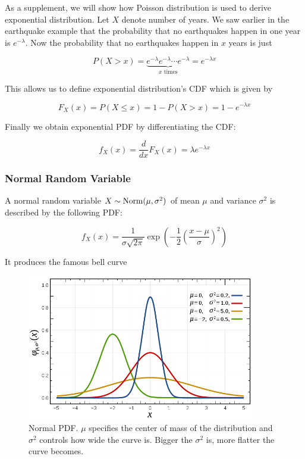 As a supplement, we will show how Poisson distribution is used to derive exponential distribution. Let $X$ denote number of years. We saw earlier in the earthquake example that the probability that no earthquakes happen in one year is $e^{-\lambda}$. Now the probability that no earthquakes happen in $x$ years is just

$$P(X>x)=\underbrace{e^{-\lambda}e^{-\lambda}\cdots e^{-\lambda}}_{\text{$x$ times}}=e^{-\lambda x}$$

This allows us to define exponential distribution's CDF which is given by

$$F_X(x)=P(X\le x)=1-P(X>x)=1-e^{-\lambda x}$$

Finally we obtain exponential PDF by differentiating the CDF:

$$f_X(x)=\frac{d}{dx}F_X(x)=\lambda e^{-\lambda x}$$

\subsubsection{Normal Random Variable}

A normal random variable $X\sim \operatorname{Norm}(\mu,\sigma^2)$ of mean $\mu$ and variance $\sigma^2$ is described by the following PDF:

$$f_X(x)=\frac{1}{\sigma\sqrt{2\pi}}\exp\left(-\frac12 \left( \frac{x-\mu}{\sigma} \right)^2\right)$$

It produces the famous bell curve

\begin{figure}[H]
	\centering
	\includegraphics[width=100mm]{15.png}
	\caption{Normal PDF. $\mu$ specifies the center of mass of the distribution and $\sigma^2$ controls how wide the curve is. Bigger the $\sigma^2$ is, more flatter the curve becomes.}
\end{figure}

